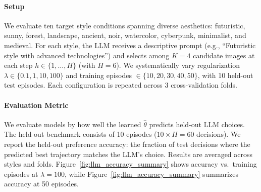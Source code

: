 \documentclass{article}
\begin{document}
\vspace{-0.2cm}  \paragraph{Setup}
We evaluate ten target style conditions spanning diverse aesthetics: futuristic, sunny, forest, landscape, ancient, noir, watercolor, cyberpunk, minimalist, and medieval. For each style, the LLM receives a descriptive prompt (e.g., ``Futuristic style with advanced technologies'') and selects among $K{=}4$ candidate images at each step $h \in \{1,\dots,H\}$ (with $H{=}6$). We systematically vary regularization $\lambda \in \{0.1, 1, 10, 100\}$ and training episodes $\in \{10, 20, 30, 40, 50\}$, with 10 held-out test episodes. Each configuration is repeated across 3 cross-validation folds.

\vspace{-0.2cm}  \paragraph{Evaluation Metric}
We evaluate models by how well the learned $\hat{\theta}$ predicts held-out LLM choices. The held-out benchmark consists of 10 episodes ($10{\times}H{=}60$ decisions). We report the held-out preference accuracy: the fraction of test decisions where the predicted best trajectory matches the LLM's choice. Results are averaged across styles and folds. Figure~\ref{fig:llm_accuracy_summary} shows accuracy vs.\ training episodes at $\lambda{=}100$, while Figure~\ref{fig:llm_accuracy_summary} summarizes accuracy at 50 episodes.
\end{document}
